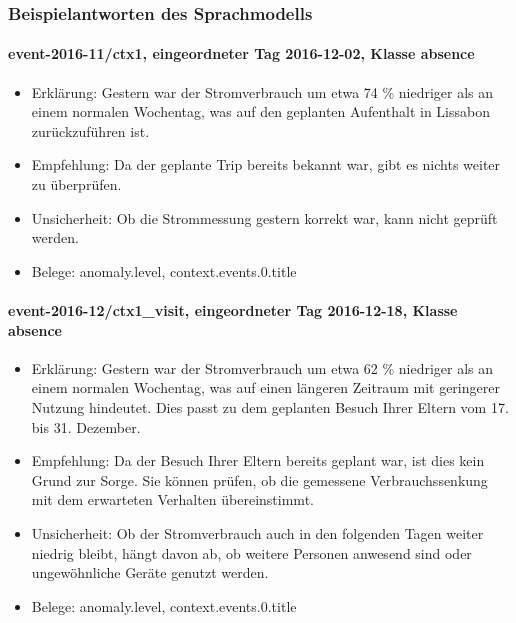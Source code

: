 \subsubsection*{Beispielantworten des Sprachmodells}

\paragraph{event-2016-11/ctx1, eingeordneter Tag 2016-12-02, Klasse absence}
\begin{itemize}
\item Erklärung: Gestern war der Stromverbrauch um etwa 74 \% niedriger als an einem normalen Wochentag, was auf den geplanten Aufenthalt in Lissabon zurückzuführen ist.
\item Empfehlung: Da der geplante Trip bereits bekannt war, gibt es nichts weiter zu überprüfen.
\item Unsicherheit: Ob die Strommessung gestern korrekt war, kann nicht geprüft werden.
\item Belege: anomaly.level, context.events.0.title
\end{itemize}

\paragraph{event-2016-12/ctx1\_\allowbreak{}visit, eingeordneter Tag 2016-12-18, Klasse absence}
\begin{itemize}
\item Erklärung: Gestern war der Stromverbrauch um etwa 62 \% niedriger als an einem normalen Wochentag, was auf einen längeren Zeitraum mit geringerer Nutzung hindeutet. Dies passt zu dem geplanten Besuch Ihrer Eltern vom 17. bis 31. Dezember.
\item Empfehlung: Da der Besuch Ihrer Eltern bereits geplant war, ist dies kein Grund zur Sorge. Sie können prüfen, ob die gemessene Verbrauchssenkung mit dem erwarteten Verhalten übereinstimmt.
\item Unsicherheit: Ob der Stromverbrauch auch in den folgenden Tagen weiter niedrig bleibt, hängt davon ab, ob weitere Personen anwesend sind oder ungewöhnliche Geräte genutzt werden.
\item Belege: anomaly.level, context.events.0.title
\end{itemize}

